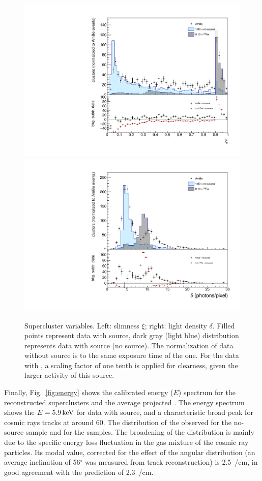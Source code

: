 \begin{figure}[ht]
  \begin{center}
  \includegraphics[width=0.45\linewidth]{figures/slimness}
  \includegraphics[width=0.45\linewidth]{figures/density}

  \caption{Supercluster variables. Left: slimness $\xi$; right: light
    density $\delta$. Filled points represent data with \ambe source,
    dark gray (light blue) distribution represents data with \fe
    source (no source).  The normalization of data without source is
    to the same exposure time of the \ambe one. For the data with \fe,
    a scaling factor of one tenth is applied for clearness, given the
    larger activity of this source. \label{fig:clshape}}

\end{center}
\end{figure}

Finally, Fig.~\ref{fig:energy} shows the calibrated energy ($E$)
spectrum for the reconstructed superclusters and the average projected
\dedl. The energy spectrum shows the $E=5.9\,\textrm{ke\hspace{-.08em}V}$ for data
with \fe source, and a characteristic broad peak for cosmic rays
tracks at around 60\keV. The distribution of the observed
\dedl for the no-source sample and for the \ambe
samples. The broadening of the distribution is mainly due to the
specific energy loss fluctuation in the gas mixture of the cosmic ray
particles.  Its modal value, corrected for the effect of the angular
distribution (an average inclination of 56$^{\circ}$ was measured from
track reconstruction) is 2.5~\keV/cm, in good agreement with
the \garfield prediction of 2.3~\keV/cm.

